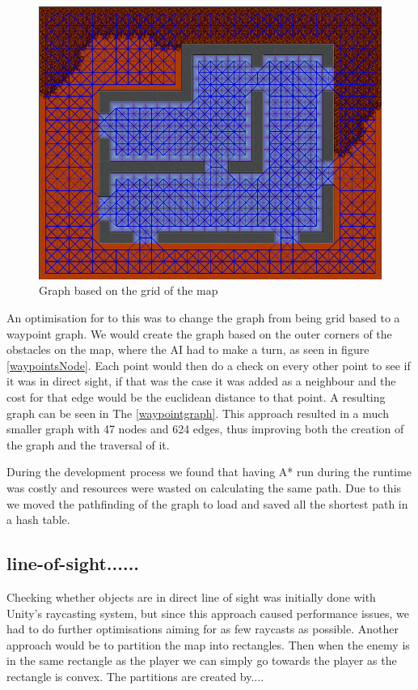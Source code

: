 \begin{figure}[H]
	\includegraphics[width=\textwidth]{figures/astar/gridGraph}
	\caption{Graph based on the grid of the map}
	\label{gridGraph}
\end{figure}

An optimisation for to this was to change the graph from being grid based to a waypoint graph.
We would create the graph based on the outer corners of the obstacles on the map, where the AI had to make a turn, as seen in figure \ref{waypointsNode}.
Each point would then do a check on every other point to see if it was in direct sight, if that was the case it was added as a neighbour and the cost for that edge would be the euclidean distance to that point.
A resulting graph can be seen in The  \ref{waypointgraph}.
This approach resulted in a much smaller graph with 47 nodes and 624 edges, thus improving both the creation of the graph and the traversal of it.

During the development process we found that having A* run during the runtime was costly and resources were wasted on calculating the same path.
Due to this we moved the pathfinding of the graph to load and saved all the shortest path in a hash table.



\subsection{line-of-sight......}
Checking whether objects are in direct line of sight was initially done with Unity's raycasting system, but since this approach caused performance issues, we had to do further optimisations aiming for as few raycasts as possible.
Another approach would be to partition the map into rectangles.
Then when the enemy is in the same rectangle as the player we can simply go towards the player as the rectangle is convex.
The partitions are created by.... 

